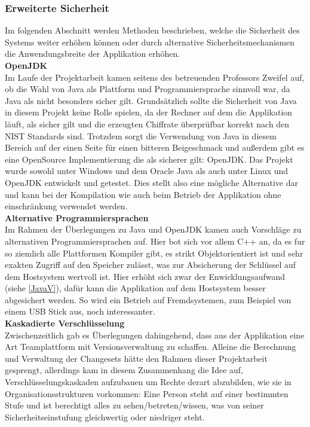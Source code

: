 \documentclass[12pt,a4paper,bibliography=totocnumbered,listof=totocnumbered]{scrartcl}
\begin{document}
\subsubsection{Erweiterte Sicherheit}
Im folgenden Abschnitt werden Methoden beschrieben, welche die Sicherheit des Systems weiter erhöhen können oder durch alternative Sicherheitsmechanismen die Anwendungsbreite der Applikation erhöhen.
\\\textbf{OpenJDK}\\
Im Laufe der Projektarbeit kamen seitens des betreuenden Professors Zweifel auf, ob die Wahl von Java als Plattform und Programmiersprache sinnvoll war, da Java als nicht besonders sicher gilt. Grundsätzlich sollte die Sicherheit von Java in diesem Projekt keine Rolle spielen, da der Rechner auf dem die Applikation läuft, als sicher gilt und die erzeugten Chiffrate überprüfbar korrekt nach den NIST Standards sind. Trotzdem sorgt die Verwendung von Java in diesem Bereich auf der einen Seite für einen bitteren Beigeschmack und außerdem gibt es eine OpenSource Implementierung die als sicherer gilt: OpenJDK. Das Projekt wurde sowohl unter Windows und dem Oracle Java als auch unter Linux und OpenJDK entwickelt und getestet. Dies stellt also eine mögliche Alternative dar und kann bei der Kompilation wie auch beim Betrieb der Applikation ohne einschränkung verwendet werden. 
\\\textbf{Alternative Programmiersprachen}\\
Im Rahmen der Überlegungen zu Java und OpenJDK kamen auch Vorschläge zu alternativen Programmiersprachen auf. Hier bot sich vor allem C++ an, da es fur so ziemlich alle Plattformen Kompiler gibt, es strikt Objektorientiert ist und sehr exakten Zugriff auf den Speicher zulässt, was zur Absicherung der Schlüssel auf dem Hostsystem wertvoll ist. Hier erhöht sich zwar der Enwicklungsaufwand (siehe \ref{JavaV}), dafür kann die Applikation auf dem Hostsystem besser abgesichert werden. So wird ein Betrieb auf Fremdsystemen, zum Beispiel von einem USB Stick aus, noch interessanter.
\\\textbf{Kaskadierte Verschlüsselung}\\
Zwischenzeitlich gab es Überlegungen dahingehend, dass aus der Applikation eine Art Teamplattform mit Versionsverwaltung zu schaffen. Alleine die Berechnung und Verwaltung der Changesets hätte den Rahmen dieser Projektarbeit gesprengt, allerdings kam in diesem Zusammenhang die Idee auf, Verschlüsselungskaskaden aufzubauen um Rechte derart abzubilden, wie sie in Organisationsstrukturen vorkommen: Eine Person steht auf einer bestimmten Stufe und ist berechtigt alles zu sehen/betreten/wissen, was von seiner Sicherheitseinstufung gleichwertig oder niedriger steht.
\end{document}
